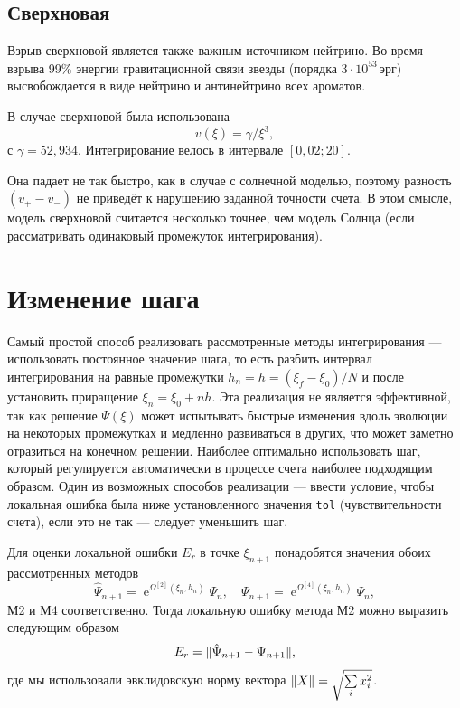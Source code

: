 \documentclass[12pt]{article}
\DeclareMathOperator{\Exp}{e}
\DeclarePairedDelimiter{\norm}{\lVert}{\rVert}
\renewcommand\exp\Exp
\begin{document}
\subsection{Сверхновая}

Взрыв сверхновой является также важным источником нейтрино. Во время взрыва 99\%
энергии гравитационной связи звезды (порядка \(3\cdot10^{53}\,\text{эрг}\))
высвобождается в виде нейтрино и антинейтрино всех ароматов.

В случае сверхновой была использована
\begin{equation}
  v(\xi)=\gamma/\xi^3,
\end{equation}
с $\gamma=52{,}934$. Интегрирование велось в интервале $[0{,}02;20]$.

Она падает не так быстро, как в случае с солнечной моделью, поэтому разность
$(v_+-v_-)$ не приведёт к нарушению заданной точности счета. В этом смысле, модель сверхновой считается несколько точнее, чем модель Солнца (если рассматривать одинаковый промежуток интегрирования).

\section{Изменение шага}

Самый простой способ реализовать рассмотренные методы интегрирования —
использовать постоянное значение шага, то есть разбить интервал интегрирования
на равные промежутки $h_n=h=(\xi_f-\xi_0)/N$ и после установить приращение
$\xi_n=\xi_0+nh$. Эта реализация не является эффективной, так как решение
$\Psi(\xi)$ может испытывать быстрые изменения вдоль эволюции на некоторых
промежутках и медленно развиваться в других, что может заметно отразиться на
конечном решении. Наиболее оптимально использовать шаг, который регулируется
автоматически в процессе счета наиболее подходящим образом.  Один из возможных
способов реализации — ввести условие, чтобы локальная ошибка была ниже
установленного значения \verb|tol| (чувствительности счета), если это не так —
следует уменьшить шаг.

Для оценки локальной ошибки $E_r$ в точке $\xi_{n+1}$ понадобятся значения обоих
рассмотренных методов
\begin{equation}
  \hat\Psi_{n+1}=\exp^{\Omega^{[2]}(\xi_n,h_n)}\Psi_n,
  \quad
  \Psi_{n+1}=\exp^{\Omega^{[4]}(\xi_n,h_n)}\Psi_n,
\end{equation}
М2 и М4 соответственно. Тогда локальную ошибку метода М2 можно выразить
следующим образом
\begin{equation}\label{Er}
  E_r=\norm{\hat\Psi_{n+1} - \Psi_{n+1}},
\end{equation}
где мы использовали эвклидовскую норму вектора
$\norm{X}=\sqrt{\sum\limits_i x^2_i}$.
\end{document}

